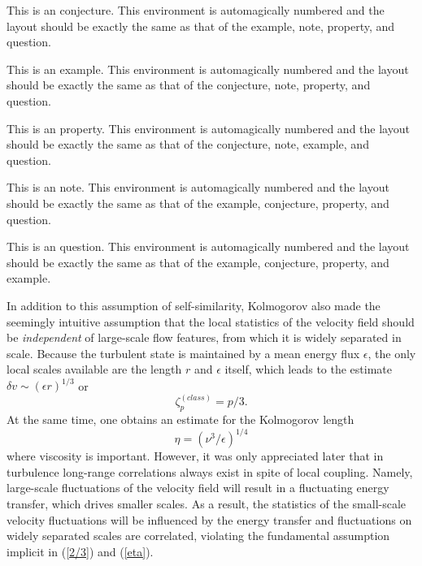 \documentclass[dc]{svjour}
\begin{document}
\begin{conjecture}
This is an conjecture. This environment is automagically numbered  and the
layout should be exactly the same as that of the example, note,
property, and question.
\end{conjecture}

\begin{example}
This is an example. This environment is automagically numbered  and the
layout should be exactly the same as that of the conjecture, note,
property, and question.
\end{example}

\begin{property}
This is an property. This environment is automagically numbered  and the
layout should be exactly the same as that of the conjecture, note,
example, and question.
\end{property}

\begin{note}
This is an note. This environment is automagically numbered  and the
layout should be exactly the same as that of the example,
conjecture, property, and question.
\end{note}

\begin{question}
This is an question. This environment is automagically numbered  and the
layout should be exactly the same as that of the example,
conjecture, property, and example.
\end{question}

In addition to this assumption of self-similarity, Kolmogorov
\cite{kolmogorov41} also made the seemingly intuitive assumption that
the local statistics of the velocity field should be {\it independent}
of large-scale flow features, from which it is widely separated in scale.
Because the turbulent state is maintained by a mean energy flux
$\epsilon$, the only local scales available are the length $r$ and
$\epsilon$ itself, which leads to the estimate $\delta v \sim
(\epsilon r)^{1/3}$ or
\begin{equation}
  \label{2/3}
    \zeta^{(class)}_p = p/3 .
\end{equation}
At the same time, one obtains an estimate for the Kolmogorov length
\begin{equation}
  \label{eta}
    \eta = (\nu^3/\epsilon)^{1/4}
\end{equation}
where viscosity is important. However, it was only appreciated later
\cite{landau59} that in turbulence long-range correlations
always exist in spite of local coupling. Namely, large-scale fluctuations
of the velocity field will result in a fluctuating energy transfer,
which drives smaller scales. As a result, the statistics of the small-scale
velocity fluctuations will be influenced by the energy transfer
and fluctuations on widely separated scales are correlated,
violating the fundamental assumption implicit in (\ref{2/3}) and
(\ref{eta}).
\end{document}
